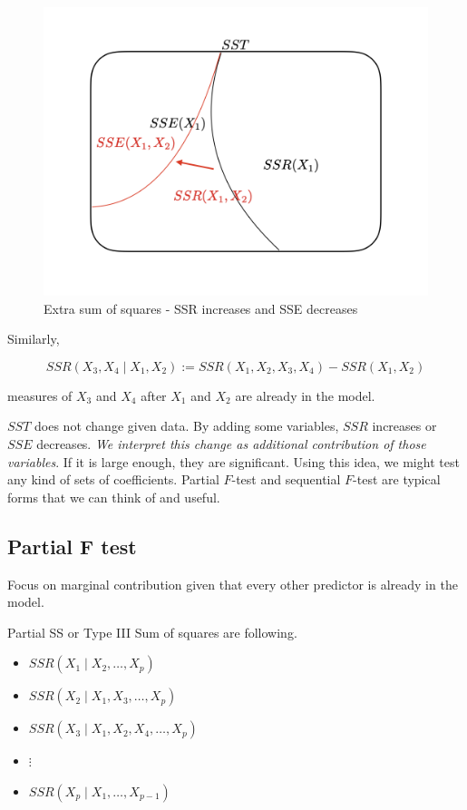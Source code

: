 \documentclass[]{book}
\theoremstyle{definition}
\theoremstyle{definition}
\theoremstyle{definition}
\theoremstyle{remark}
\let\BeginKnitrBlock\begin \let\EndKnitrBlock\end
\begin{document}
\begin{figure}[H]

{\centering \includegraphics[width=0.7\linewidth]{images/multiple-extrass} 

}

\caption{Extra sum of squares - SSR increases and SSE decreases}\label{fig:essfig}
\end{figure}

Similarly,

\[SSR(X_3, X_4 \mid X_1, X_2) := SSR(X_1, X_2, X_3, X_4) - SSR(X_1, X_2)\]

measures of \(X_3\) and \(X_4\) after \(X_1\) and \(X_2\) are already in the model.

\(SST\) does not change given data. By adding some variables, \(SSR\) increases or \(SSE\) decreases. \emph{We interpret this change as additional contribution of those variables}. If it is large enough, they are significant. Using this idea, we might test any kind of sets of coefficients. Partial \(F\)-test and sequential \(F\)-test are typical forms that we can think of and useful.

\hypertarget{partial-f-test}{%
\subsection{Partial F test}\label{partial-f-test}}

Focus on marginal contribution given that every other predictor is already in the model.

\BeginKnitrBlock{definition}[Partial sum of squares]
\protect\hypertarget{def:pss}{}{\label{def:pss} {} }Partial SS or Type III Sum of squares are following.

\begin{itemize}
  \item $SSR(X_1 \mid X_2, \ldots, X_p)$
  \item $SSR(X_2 \mid X_1, X_3, \ldots, X_p)$
  \item $SSR(X_3 \mid X_1, X_2, X_4, \ldots, X_p)$
  \item $\vdots$
  \item $SSR(X_p \mid X_1, \ldots, X_{p - 1})$
\end{itemize}
\EndKnitrBlock{definition}
\end{document}
